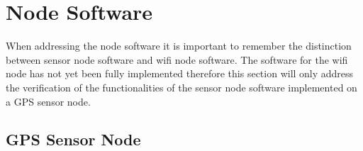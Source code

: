 \section{Node Software}
When addressing the node software it is important to remember the distinction between sensor node software and wifi node software.
The software for the wifi node has not yet been fully implemented therefore this section will only address the verification of the functionalities of the sensor node software implemented on a GPS sensor node.

\subsection{GPS Sensor Node}
